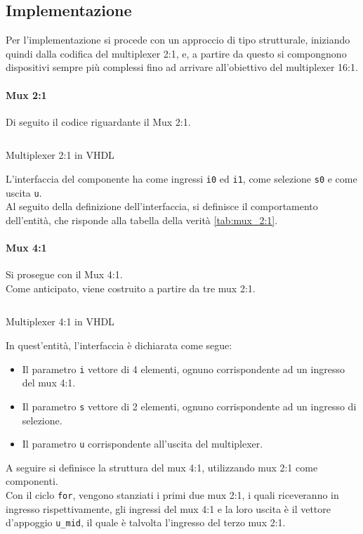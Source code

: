 \subsection{Implementazione}
Per l'implementazione si procede con un approccio di tipo strutturale, iniziando quindi dalla codifica del multiplexer 2:1, e, a partire da questo si compongnono dispositivi sempre più complessi fino ad arrivare all'obiettivo del multiplexer 16:1.
\paragraph{Mux 2:1} Di seguito il codice riguardante il Mux 2:1.
\begin{code}
    \inputminted[frame=lines, framesep=2mm, baselinestretch=1.2, bgcolor=LightGray, fontsize=\footnotesize, linenos]{vhdl}{vhdl_files/mux_2_1.vhdl}
    \caption{Multiplexer 2:1 in VHDL}
    \label{lst:mux_2_1}
\end{code}
L'interfaccia del componente ha come ingressi \texttt{i0} ed \texttt{i1}, come selezione \texttt{s0} e come uscita \texttt{u}.\\
Al seguito della definizione dell'interfaccia, si definisce il comportamento dell'entità, che risponde alla tabella della verità \ref{tab:mux_2:1}.\\
\paragraph{Mux 4:1} Si prosegue con il Mux 4:1. \\
Come anticipato, viene costruito a partire da tre mux 2:1.
\begin{code}
    \inputminted[frame=lines, framesep=2mm, baselinestretch=1.2, bgcolor=LightGray, fontsize=\footnotesize, linenos]{vhdl}{vhdl_files/mux_4_1.vhdl}
    \caption{Multiplexer 4:1 in VHDL}
    \label{lst:mux_4_1}
\end{code}
In quest'entità, l'interfaccia è dichiarata come segue:
\begin{itemize}
    \item Il parametro \texttt{i} vettore di 4 elementi, ognuno corrispondente ad un ingresso del mux 4:1.
    \item Il parametro \texttt{s} vettore di 2 elementi, ognuno corrispondente ad un ingresso di selezione.
    \item Il parametro \texttt{u} corrispondente all'uscita del multiplexer.
\end{itemize}
A seguire si definisce la struttura del mux 4:1, utilizzando mux 2:1 come componenti. \\
Con il ciclo \texttt{for}, vengono stanziati i primi due mux 2:1, i quali riceveranno in ingresso rispettivamente, gli ingressi del mux 4:1 e la loro uscita è il vettore d'appoggio \texttt{u\_mid}, il quale è talvolta l'ingresso del terzo mux 2:1.

